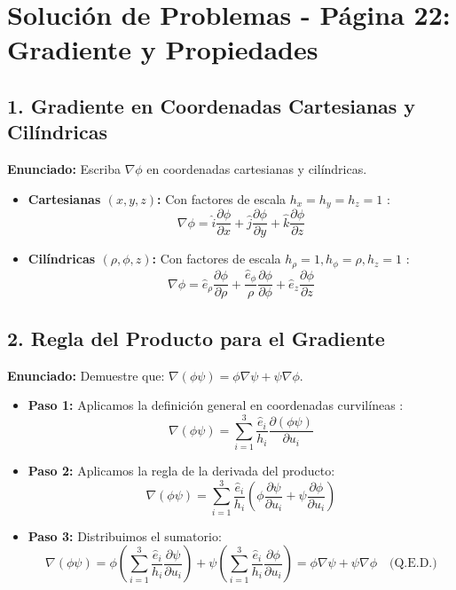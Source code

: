 \documentclass[a4paper]{article}
\begin{document}
\section*{Solución de Problemas - Página 22: Gradiente y Propiedades}

\subsection*{1. Gradiente en Coordenadas Cartesianas y Cilíndricas}
\textbf{Enunciado:} Escriba $\nabla \phi$ en coordenadas cartesianas y cilíndricas.

\begin{itemize}
    \item \textbf{Cartesianas $(x, y, z)$:} Con factores de escala $h_x = h_y = h_z = 1$ \cite{82}:
    \begin{equation}
        \nabla \phi = \hat{i} \frac{\partial \phi}{\partial x} + \hat{j} \frac{\partial \phi}{\partial y} + \hat{k} \frac{\partial \phi}{\partial z}
    \end{equation}
    \item \textbf{Cilíndricas $(\rho, \phi, z)$:} Con factores de escala $h_\rho = 1, h_\phi = \rho, h_z = 1$ \cite{82}:
    \begin{equation}
        \nabla \phi = \hat{e}_\rho \frac{\partial \phi}{\partial \rho} + \frac{\hat{e}_\phi}{\rho} \frac{\partial \phi}{\partial \phi} + \hat{e}_z \frac{\partial \phi}{\partial z}
    \end{equation}
\end{itemize}

\subsection*{2. Regla del Producto para el Gradiente}
\textbf{Enunciado:} Demuestre que: $\nabla(\phi \psi) = \phi \nabla \psi + \psi \nabla \phi$.

\begin{itemize}
    \item \textbf{Paso 1:} Aplicamos la definición general en coordenadas curvilíneas \cite{79, 82}:
    \begin{equation}
        \nabla(\phi \psi) = \sum_{i=1}^3 \frac{\hat{e}_i}{h_i} \frac{\partial(\phi \psi)}{\partial u_i}
    \end{equation}
    \item \textbf{Paso 2:} Aplicamos la regla de la derivada del producto:
    \begin{equation}
        \nabla(\phi \psi) = \sum_{i=1}^3 \frac{\hat{e}_i}{h_i} \left( \phi \frac{\partial \psi}{\partial u_i} + \psi \frac{\partial \phi}{\partial u_i} \right)
    \end{equation}
    \item \textbf{Paso 3:} Distribuimos el sumatorio:
    \begin{equation}
        \nabla(\phi \psi) = \phi \left( \sum_{i=1}^3 \frac{\hat{e}_i}{h_i} \frac{\partial \psi}{\partial u_i} \right) + \psi \left( \sum_{i=1}^3 \frac{\hat{e}_i}{h_i} \frac{\partial \phi}{\partial u_i} \right) = \phi \nabla \psi + \psi \nabla \phi \quad \text{(Q.E.D.)}
    \end{equation}
\end{itemize}
\end{document}
